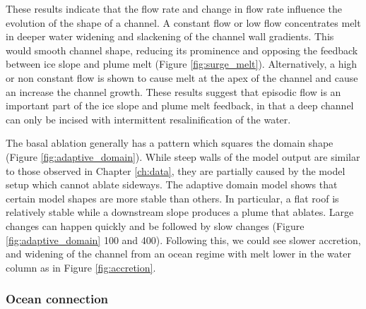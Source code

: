 These results indicate that the flow rate and change in flow rate influence the evolution of the shape of a channel. A constant flow or low flow concentrates melt in deeper water widening and slackening of the channel wall gradients. This would smooth channel shape, reducing its prominence and opposing the feedback between ice slope and plume melt (Figure \ref{fig:surge_melt}). 
Alternatively, a high or non constant flow is shown to cause melt at the apex of the channel and cause an increase the channel growth. 
These results suggest that episodic flow is an important part of the ice slope and plume melt feedback, in that a deep channel can only be incised with intermittent resalinification of the water. 

The basal ablation generally has a pattern which squares the domain shape (Figure \ref{fig:adaptive_domain}). While steep walls of the model output are similar to those observed in Chapter \ref{ch:data}, they are partially caused by the model setup which cannot ablate sideways. The adaptive domain model shows that certain model shapes are more stable than others. In particular, a flat roof is relatively stable while a downstream slope produces a plume that ablates. Large changes can happen quickly and be followed by slow changes (Figure \ref{fig:adaptive_domain} 100 and 400).  Following this, we could see slower accretion, and widening of the channel from an ocean regime with melt lower in the water column as in Figure \ref{fig:accretion}.

\subsubsection{Ocean connection}

